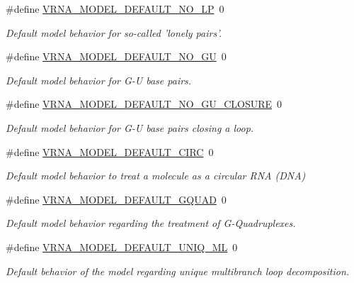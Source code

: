 \begin{DoxyCompactItemize}
\#define \hyperlink{group__model__details_gab72462726dd60ed0d43339bbf7ee08ad}{V\-R\-N\-A\-\_\-\-M\-O\-D\-E\-L\-\_\-\-D\-E\-F\-A\-U\-L\-T\-\_\-\-N\-O\-\_\-\-L\-P}~0
\begin{DoxyCompactList}\small\item\em Default model behavior for so-\/called 'lonely pairs'. \end{DoxyCompactList}\item 
\#define \hyperlink{group__model__details_ga34702f7d14d38b877ba8e475281e97e2}{V\-R\-N\-A\-\_\-\-M\-O\-D\-E\-L\-\_\-\-D\-E\-F\-A\-U\-L\-T\-\_\-\-N\-O\-\_\-\-G\-U}~0
\begin{DoxyCompactList}\small\item\em Default model behavior for G-\/\-U base pairs. \end{DoxyCompactList}\item 
\#define \hyperlink{group__model__details_ga5308de46faaca4b9fd16045864901ee7}{V\-R\-N\-A\-\_\-\-M\-O\-D\-E\-L\-\_\-\-D\-E\-F\-A\-U\-L\-T\-\_\-\-N\-O\-\_\-\-G\-U\-\_\-\-C\-L\-O\-S\-U\-R\-E}~0
\begin{DoxyCompactList}\small\item\em Default model behavior for G-\/\-U base pairs closing a loop. \end{DoxyCompactList}\item 
\#define \hyperlink{group__model__details_ga22059033db7bcd875c51fec32425490a}{V\-R\-N\-A\-\_\-\-M\-O\-D\-E\-L\-\_\-\-D\-E\-F\-A\-U\-L\-T\-\_\-\-C\-I\-R\-C}~0
\begin{DoxyCompactList}\small\item\em Default model behavior to treat a molecule as a circular R\-N\-A (D\-N\-A) \end{DoxyCompactList}\item 
\#define \hyperlink{group__model__details_ga793ed812e86f43799b14b2deee917f23}{V\-R\-N\-A\-\_\-\-M\-O\-D\-E\-L\-\_\-\-D\-E\-F\-A\-U\-L\-T\-\_\-\-G\-Q\-U\-A\-D}~0
\begin{DoxyCompactList}\small\item\em Default model behavior regarding the treatment of G-\/\-Quadruplexes. \end{DoxyCompactList}\item 
\#define \hyperlink{group__model__details_ga63f6006a02ba2d89148441f406c309e7}{V\-R\-N\-A\-\_\-\-M\-O\-D\-E\-L\-\_\-\-D\-E\-F\-A\-U\-L\-T\-\_\-\-U\-N\-I\-Q\-\_\-\-M\-L}~0
\begin{DoxyCompactList}\small\item\em Default behavior of the model regarding unique multibranch loop decomposition. \end{DoxyCompactList}\item 

\end{DoxyCompactItemize}
